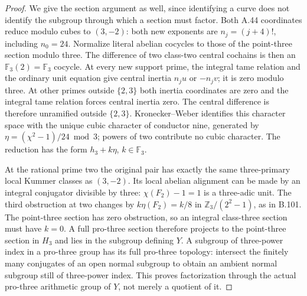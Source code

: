 \begin{proof}
We give the section argument as well, since identifying a curve does
not identify the subgroup through which a section must factor.
Both A.44 coordinates reduce modulo cubes to $(3,-2)$: both new
exponents are $n_j=(j+4)!$, including $n_0=24$. Normalize literal
abelian cocycles to those of the point-three section modulo three.
The difference of two class-two central cochains is then an
$\mathbb F_3(2)=\mathbb F_3$ cocycle. At every new support prime,
the integral tame relation and the ordinary unit equation give
central inertia $n_j u$ or $-n_jv$; it is zero modulo three.
At other primes outside $\{2,3\}$ both inertia coordinates are zero
and the integral tame relation forces central inertia zero. The
central difference is therefore unramified outside $\{2,3\}$.
Kronecker--Weber identifies this character space with the unique
cubic character of conductor nine, generated by
$\eta=(\chi^2-1)/24\bmod3$; powers of two contribute no cubic
character. The reduction has the form $h_3+k\eta$, $k\in\mathbb F_3$.

At the rational prime two the original pair has exactly the same
three-primary local Kummer classes as $(3,-2)$. Its local abelian
alignment can be made by an integral conjugator divisible by three:
$\chi(F_2)-1=1$ is a three-adic unit. The third obstruction at two
changes by $k\eta(F_2)=k/8$ in $\mathbb Z_3/(2^2-1)$, as in B.101.
The point-three section has zero obstruction, so an integral class-three
section must have $k=0$. A full pro-three section therefore projects
to the point-three section in $H_3$ and lies in the subgroup defining
$Y$. A subgroup of three-power index in a pro-three group has its
full pro-three topology: intersect the finitely many conjugates of
an open normal subgroup to obtain an ambient normal subgroup still
of three-power index. This proves factorization through the actual
pro-three arithmetic group of $Y$, not merely a quotient of it.
\end{proof}

